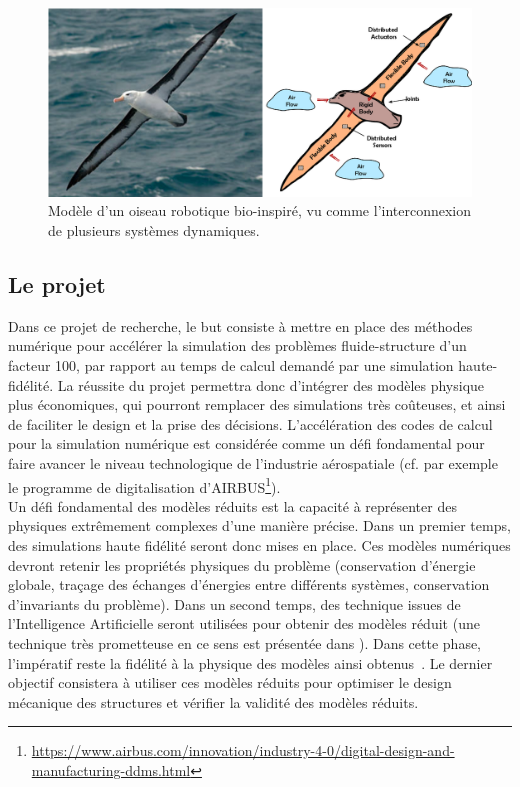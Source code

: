 \documentclass[french]{article}
\begin{document}
\begin{figure}[tb]
	\centering
	\includegraphics[width = \textwidth]{Bird_Port_Hamiltonian_Subsystems_FULL_ARC.eps}
	\caption{Modèle d'un oiseau robotique bio-inspiré, vu comme l'interconnexion de plusieurs systèmes dynamiques. }
	\label{fig:pH_view_bird}
\end{figure}

\subsection{Le projet}
Dans ce projet de recherche, le but consiste \`a mettre en place des méthodes numérique pour accélérer la simulation des problèmes fluide-structure d'un facteur 100, par rapport au temps de calcul demandé par une simulation haute-fidélité.  La réussite du projet permettra donc d'intégrer des modèles physique plus économiques, qui pourront remplacer des simulations très co\^{u}teuses, et ainsi de faciliter le design et la prise des décisions. L'accélération des codes de calcul pour la simulation numérique est considérée comme  un défi fondamental pour faire avancer le niveau technologique de l'industrie aérospatiale (cf. par exemple  le programme de digitalisation d'AIRBUS\footnote{\url{https://www.airbus.com/innovation/industry-4-0/digital-design-and-manufacturing-ddms.html}}).   \\

Un défi fondamental des modèles réduits est la capacité \`a représenter des physiques extrêmement complexes d'une manière précise. 
Dans un premier temps, des simulations haute fidélité seront donc mises en place. Ces modèles numériques devront retenir les propriétés physiques du problème (conservation d'énergie globale, traçage des échanges d'énergies entre différents systèmes, conservation d'invariants du problème). Dans un second temps, des technique issues de l'Intelligence Artificielle seront utilisées pour obtenir des modèles réduit (une technique très prometteuse en ce sens est présentée dans \cite{lee2020}). Dans cette phase, l'impératif reste la fidélité \`a la physique des modèles ainsi obtenus~\cite{willcox2021}. Le dernier objectif consistera \`a utiliser ces modèles réduits pour optimiser le design mécanique des structures et vérifier la validité des modèles réduits.\\
\end{document}

